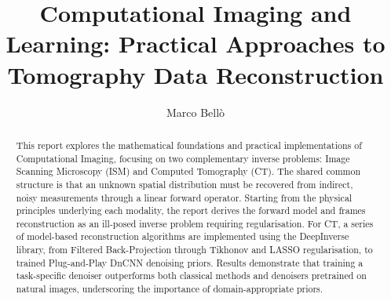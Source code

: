 \documentclass[manuscript,screen,review]{acmart}
\begin{document}
\title{Computational Imaging and Learning: Practical Approaches to Tomography Data Reconstruction}

\author{Marco Bellò}



\renewcommand{\shortauthors}{Bellò}

\begin{abstract}
This report explores the mathematical foundations and practical implementations of Computational Imaging, focusing on two complementary inverse problems: Image Scanning Microscopy (ISM) and Computed Tomography (CT). The shared common structure is that an unknown spatial distribution must be recovered from indirect, noisy measurements through a linear forward operator. Starting from the physical principles underlying each modality, the report derives the forward model and frames reconstruction as an ill-posed inverse problem requiring regularisation. For CT, a series of model-based reconstruction algorithms are implemented using the DeepInverse library, from Filtered Back-Projection through Tikhonov and LASSO regularisation, to trained Plug-and-Play DnCNN denoising priors. Results demonstrate that training a task-specific denoiser outperforms both classical methods and denoisers pretrained on natural images, underscoring the importance of domain-appropriate priors.
\end{abstract}
\end{document}
